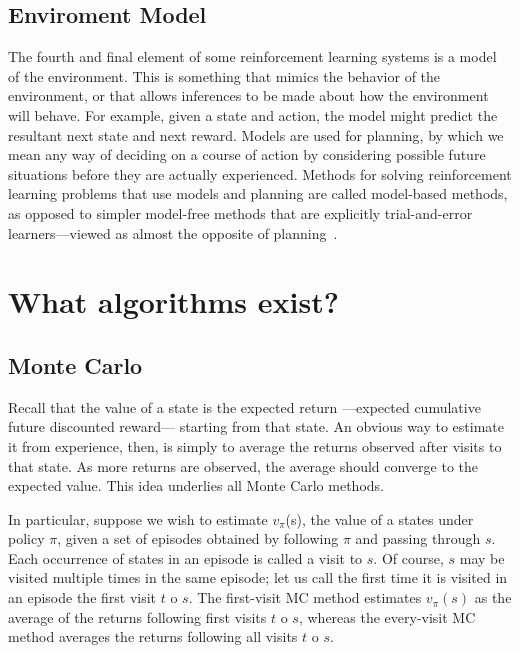 \documentclass[letterpaper, 10 pt]{IEEEconf}
\begin{document}
\subsection{Enviroment Model}

The fourth and final element of some reinforcement learning systems is
a model of the environment. This is something that mimics the behavior
of the environment, or that allows inferences to be made about how the
environment will behave. For example, given a state and action, the
model might predict the resultant next state and next reward. Models
are used for planning, by which we mean any way of deciding on a
course of action by considering possible future situations before they
are actually experienced. Methods for solving reinforcement learning
problems that use models and planning are called model-based methods,
as opposed to simpler model-free methods that are explicitly
trial-and-error learners—viewed as almost the opposite of planning~\cite{sutton2018reinforcement}.

\section{What algorithms exist?}

\subsection{Monte Carlo}

Recall that the value of a state is the expected return —expected cumulative future discounted reward— starting from that state. An obvious way to estimate it from experience, then, is simply to average the returns observed after visits to that state. As more returns are observed, the average should converge to the expected value. This idea underlies all Monte Carlo methods.

In particular, suppose we wish to estimate $v_\pi$(s), the value of a
states under policy $\pi$, given a set of episodes obtained by
following $\pi$ and passing through $s$. Each occurrence of states in an
episode is called a visit to $s$. Of course, $s$ may be visited multiple
times in the same episode; let us call the first time it is visited in
an episode the first visit $t$ o $s$. The first-visit MC method estimates
$v_\pi(s)$ as the average of the returns following first visits $t$ o $s$,
whereas the every-visit MC method averages the returns following all
visits $t$ o $s$.
\end{document}
